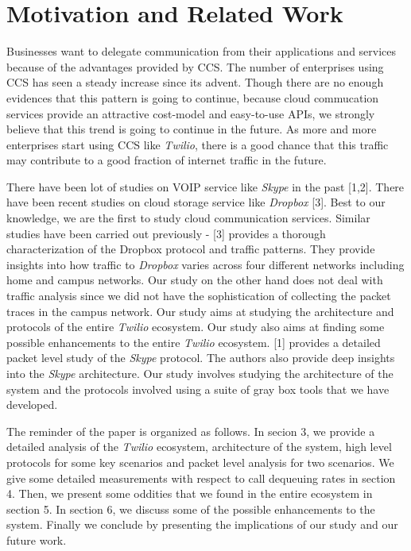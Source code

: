 \section{Motivation and Related Work}
\label{sec-motivationandrelated}
Businesses want to delegate communication from their applications and services because of the advantages provided by CCS. The number of enterprises using CCS has seen a steady increase since its advent. Though there are no enough evidences that this pattern is going to continue, because cloud commucation services provide an attractive cost-model and easy-to-use APIs, we strongly believe that this trend is going to continue in the future. As more and more enterprises start using CCS like \textit{Twilio}, there is a good chance that this traffic may contribute to a good fraction of internet traffic in the future. \par
There have been lot of studies on VOIP service like \textit{Skype} in the past [1,2]. There have been recent studies on cloud storage service like \textit{Dropbox} [3]. Best to our knowledge, we are the first to study cloud communication services. Similar studies have been carried out previously - [3] provides a thorough characterization of the Dropbox protocol and traffic patterns. They provide insights into how traffic to \textit{Dropbox} varies across four different networks including home and campus networks. Our study on the other hand does not deal with traffic analysis since we did not have the sophistication of collecting the packet traces in the campus network. Our study aims at studying the architecture and protocols of the entire \textit{Twilio} ecosystem. Our study also aims at finding some possible enhancements to the entire \textit{Twilio} ecosystem. [1] provides a detailed packet level study of the \textit{Skype} protocol. The authors also provide deep insights into the \textit{Skype} architecture. Our study involves studying the architecture of the system and the protocols involved using a suite of gray box tools that we have developed. \par
The reminder of the paper is organized as follows. In secion 3, we provide a detailed analysis of the \textit{Twilio} ecosystem, architecture of the system, high level protocols for some key scenarios and packet level analysis for two scenarios. We give some detailed measurements with respect to call dequeuing rates in section 4. Then, we present some oddities that we found in the entire ecosystem in section 5. In section 6, we discuss some of the possible enhancements to the system. Finally we conclude by presenting the implications of our study and our future work.